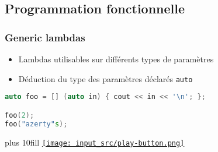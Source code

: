\documentclass[C++.tex]{subfiles}
\begin{document}
\subsection*{Programmation fonctionnelle}
\begin{frame}[fragile]
	\frametitle{Generic lambdas}
	\begin{itemize}
		\item Lambdas utilisables sur différents types de paramètres
		\item Déduction du type des paramètres déclarés \lstinline|auto|
	\end{itemize}

	\begin{lstlisting}[language=C++]
auto foo = [] (auto in) { cout << in << '\n'; };

foo(2);
foo("azerty"s);\end{lstlisting}

	\vskip 10mm plus 10fill
	\hfill
	\href{https://godbolt.org/#g:!((g:!((g:!((h:codeEditor,i:(filename:'1',fontScale:14,fontUsePx:'0',j:1,lang:c%2B%2B,selection:(endColumn:1,endLineNumber:12,positionColumn:1,positionLineNumber:12,selectionStartColumn:1,selectionStartLineNumber:12,startColumn:1,startLineNumber:12),source:'%23include+%3Ciostream%3E%0A%23include+%3Cstring%3E%0A%0Ausing+namespace+std::literals%3B%0A%0Aint+main()%0A%7B%0A++auto+foo+%3D+%5B%5D+(auto+in)+%7B+std::cout+%3C%3C+in+%3C%3C+!'%5Cn!'%3B+%7D%3B%0A%0A++foo(2)%3B%0A++foo(%22azerty%22s)%3B%0A%7D%0A'),l:'5',n:'0',o:'C%2B%2B+source+%231',t:'0')),k:50,l:'4',n:'0',o:'',s:0,t:'0'),(g:!((h:executor,i:(argsPanelShown:'1',compilationPanelShown:'0',compiler:g112,compilerOutShown:'0',execArgs:'',execStdin:'',fontScale:14,fontUsePx:'0',j:1,lang:c%2B%2B,libs:!((name:boost,ver:'175')),options:'-std%3Dc%2B%2B14',source:1,stdinPanelShown:'1',tree:'1',wrap:'0'),l:'5',n:'0',o:'Executor+x86-64+gcc+11.2+(C%2B%2B,+Editor+%231)',t:'0')),header:(),k:50,l:'4',n:'0',o:'',s:0,t:'0')),l:'2',n:'0',o:'',t:'0')),version:4}{\texttt{[image: input\_src/play-button.png]}}
\end{frame}
\end{document}
